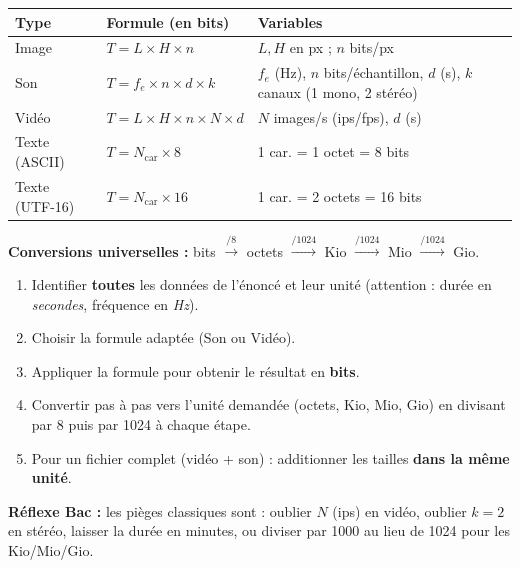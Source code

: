 \documentclass[11pt]{article}
\begin{document}
\begin{propriete}
\begin{center}
\begin{tabularx}{\linewidth}{|l|X|l|}
\hline
\textbf{Type} & \textbf{Formule (en bits)} & \textbf{Variables} \\
\hline
Image & $T = L \times H \times n$ & $L,H$ en px ; $n$ bits/px \\
\hline
Son & $T = f_e \times n \times d \times k$ & $f_e$ (Hz), $n$ bits/échantillon, $d$ (s), $k$ canaux (1 mono, 2 stéréo) \\
\hline
Vidéo & $T = L \times H \times n \times N \times d$ & $N$ images/s (ips/fps), $d$ (s) \\
\hline
Texte (ASCII) & $T = N_{\text{car}} \times 8$ & 1 car. = 1 octet = 8 bits \\
\hline
Texte (UTF-16) & $T = N_{\text{car}} \times 16$ & 1 car. = 2 octets = 16 bits \\
\hline
\end{tabularx}
\end{center}
\textbf{Conversions universelles :} bits $\xrightarrow{/8}$ octets $\xrightarrow{/1024}$ Kio $\xrightarrow{/1024}$ Mio $\xrightarrow{/1024}$ Gio.
\end{propriete}

\begin{methode}
\begin{enumerate}
  \item Identifier \textbf{toutes} les données de l'énoncé et leur unité (attention : durée en \emph{secondes}, fréquence en \emph{Hz}).
  \item Choisir la formule adaptée (Son ou Vidéo).
  \item Appliquer la formule pour obtenir le résultat en \textbf{bits}.
  \item Convertir pas à pas vers l'unité demandée (octets, Kio, Mio, Gio) en divisant par 8 puis par 1024 à chaque étape.
  \item Pour un fichier complet (vidéo + son) : additionner les tailles \textbf{dans la même unité}.
\end{enumerate}
\textbf{Réflexe Bac :} les pièges classiques sont : oublier $N$ (ips) en vidéo, oublier $k=2$ en stéréo, laisser la durée en minutes, ou diviser par 1000 au lieu de 1024 pour les Kio/Mio/Gio.
\end{methode}
\end{document}
